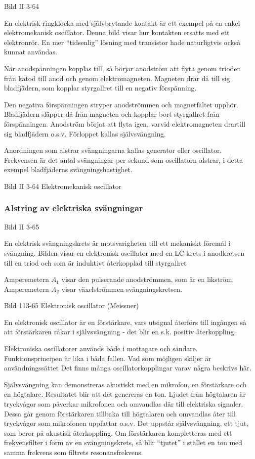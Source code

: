 Bild II 3-64

En elektrisk ringklocka med självbrytande kontakt är ett exempel på en
enkel elektromekanisk oscillator. Denna bild visar hur kontakten
ersatts med ett elektronrör. En mer ``tidsenlig'' lösning med transistor
hade naturligtvis också kunnat användas.

När anodspänningen kopplas till, så börjar anodström att flyta genom
trioden från katod till anod och genom elektromagneten.  Magneten drar
då till sig bladfjädern, som kopplar styrgallret till en negativ
förspänning.

Den negativa förspänningen stryper anodströmmen och magnetfältet
upphör. Bladfjädern släpper då från magneten och kopplar bort
styrgallret från förspänningen. Anodström börjat att flyta igen,
varvid elektromagneten drartill sig bladfjädern o.s.v. Förloppet
kallas självsvängning.

Anordningen som alstrar svängningarna kallas generator eller
oscillator. Frekvensen är det antal svängningar per sekund som
oscillatorn alstrar, i detta exempel bladfjäderns svängningshastighet.

Bild II 3-64 Elektromekanisk oscillator

\subsubsection{Alstring av elektriska svängningar}

Bild II 3-65

En elektrisk svängningskrets är motsvarigheten till ett mekaniskt
föremål i svängning.  Bilden visar en elektronisk oscillator med en
LC-krets i anodkretsen till en triod och som är induktivt återkopplad
till styrgallret

Amperemetern \(A_1\) visar den pulserande anodströmmen, som är en
likström. Amperemetern \(A_2\) visar växelströmmen svängningskretsen.

Bild 113-65 Elektronisk oscillator (Meissner)

En elektronisk oscillator är en förstärkare, vars utsignal återförs
till ingången så att förstärkaren råkar i självsvängning - det blir en
s.k. positiv återkoppling.

Elektroniska oscillatorer används både i mottagare och
sändare. Funktionsprincipen är lika i båda fallen. Vad som möjligen
skiljer är användningssättet Det finns många oscillatorkopplingar
varav några beskrivs här.

Självsvängning kan demonstreras akustiskt med en mikrofon, en
förstärkare och en högtalare. Resultatet blir att det genereras en
ton. Ljudet från högtalaren är tryckvågor som påverkar mikrofonen och
omvandlas där till elektriska signaler. Dessa går genom förstärkaren
tillbaka till högtalaren och omvandlas åter till tryckvågor som
mikrofonen uppfattar o.s.v. Det uppstår självsvängning, ett tjut, som
beror på akustisk återkoppling.  Om förstärkaren kompletteras med ett
frekvensfilter i form av en svängningskrets, så blir ``tjutet'' i
stället en ton med samma frekvens som filtrets resonansfrekvens.


